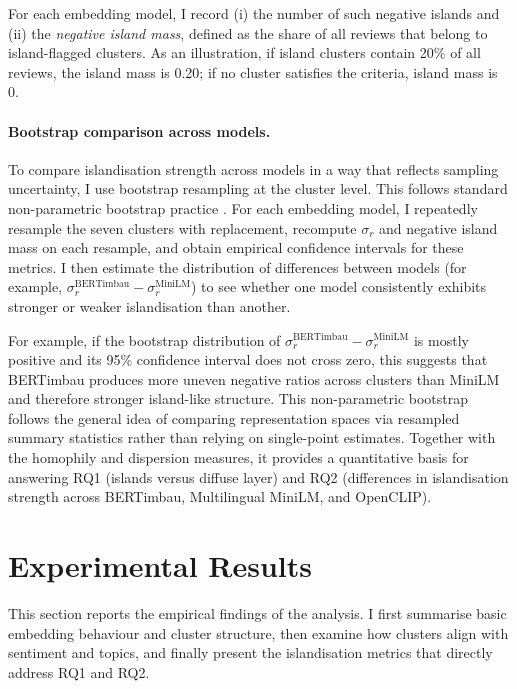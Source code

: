 \documentclass[a4paper,11pt]{article}
\begin{document}
For each embedding model, I record (i) the number of such negative islands and (ii) the \emph{negative island mass}, defined as the share of all reviews that belong to island-flagged clusters. 
As an illustration, if island clusters contain 20\% of all reviews, the island mass is 0.20; if no cluster satisfies the criteria, island mass is 0.

\paragraph{Bootstrap comparison across models.}

To compare islandisation strength across models in a way that reflects sampling uncertainty, I use bootstrap resampling at the cluster level. 
This follows standard non-parametric bootstrap practice \citep{efron-tibshirani-boot}.
For each embedding model, I repeatedly resample the seven clusters with replacement, recompute $\sigma_r$ and negative island mass on each resample, and obtain empirical confidence intervals for these metrics. 
I then estimate the distribution of differences between models (for example, $\sigma_r^{\text{BERTimbau}} - \sigma_r^{\text{MiniLM}}$) to see whether one model consistently exhibits stronger or weaker islandisation than another.

For example, if the bootstrap distribution of $\sigma_r^{\text{BERTimbau}} - \sigma_r^{\text{MiniLM}}$ is mostly positive and its 95\% confidence interval does not cross zero, this suggests that BERTimbau produces more uneven negative ratios across clusters than MiniLM and therefore stronger island-like structure. 
This non-parametric bootstrap follows the general idea of comparing representation spaces via resampled summary statistics rather than relying on single-point estimates. 
Together with the homophily and dispersion measures, it provides a quantitative basis for answering RQ1 (islands versus diffuse layer) and RQ2 (differences in islandisation strength across BERTimbau, Multilingual MiniLM, and OpenCLIP).

\section{Experimental Results}
\label{sec:results}

This section reports the empirical findings of the analysis. 
I first summarise basic embedding behaviour and cluster structure, then examine how clusters align with sentiment and topics, and finally present the islandisation metrics that directly address RQ1 and RQ2.
\end{document}
